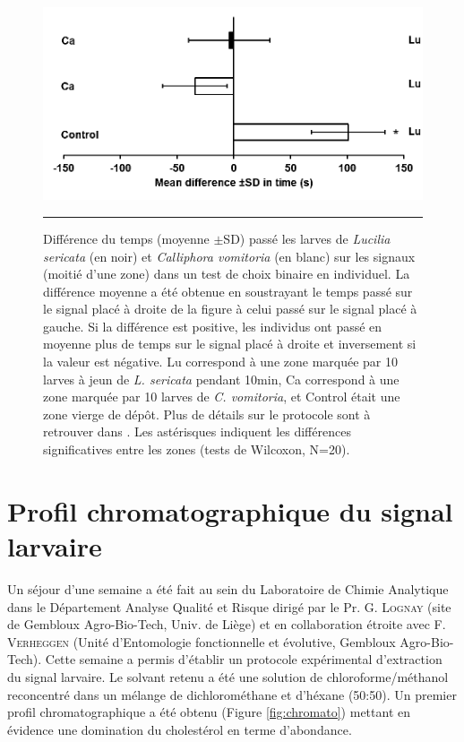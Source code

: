 \begin{figure}[ht]
\centering
		\includegraphics[width=0.8 \textwidth]{Figures/exp_pre1.png}
		\rule{35em}{0.5pt}
		\caption[Exp1]{Différence du temps (moyenne $\pm$SD) passé les larves de \textit{Lucilia sericata} (en noir) et \textit{Calliphora vomitoria} (en blanc) sur les signaux (moitié d'une zone) dans un test de choix binaire en individuel. La différence moyenne a été obtenue en soustrayant le temps passé sur le signal placé à droite de la figure à celui passé sur le signal placé à gauche. Si la différence est positive, les individus ont passé en moyenne plus de temps sur le signal placé à droite et inversement si la valeur est négative. Lu correspond à une zone marquée par 10 larves à jeun de \textit{L. sericata} pendant 10min, Ca correspond à une zone marquée par 10 larves de \textit{C. vomitoria}, et Control était une zone vierge de dépôt. Plus de détails sur le protocole sont à retrouver dans \citet{boulay_evidence_2013}. Les astérisques indiquent les différences significatives entre les zones (tests de Wilcoxon, N=20).}
	\label{fig:exp1}
    
\end{figure}


\clearpage


\section{Profil chromatographique du signal larvaire}

Un séjour d'une semaine a été fait au sein du Laboratoire de Chimie Analytique dans le Département Analyse Qualité et Risque dirigé par le Pr. G. \textsc{Lognay} (site de Gembloux Agro-Bio-Tech, Univ. de Liège) et en collaboration étroite avec F. \textsc{Verheggen} (Unité d'Entomologie fonctionnelle et évolutive, Gembloux Agro-Bio-Tech). Cette semaine a permis d'établir un protocole expérimental d'extraction du signal larvaire. Le solvant retenu a été une solution de chloroforme/méthanol reconcentré dans un mélange de dichlorométhane et d'héxane (50:50). Un premier profil chromatographique a été obtenu (Figure \ref{fig:chromato}) mettant en évidence une domination du cholestérol en terme d'abondance. 

